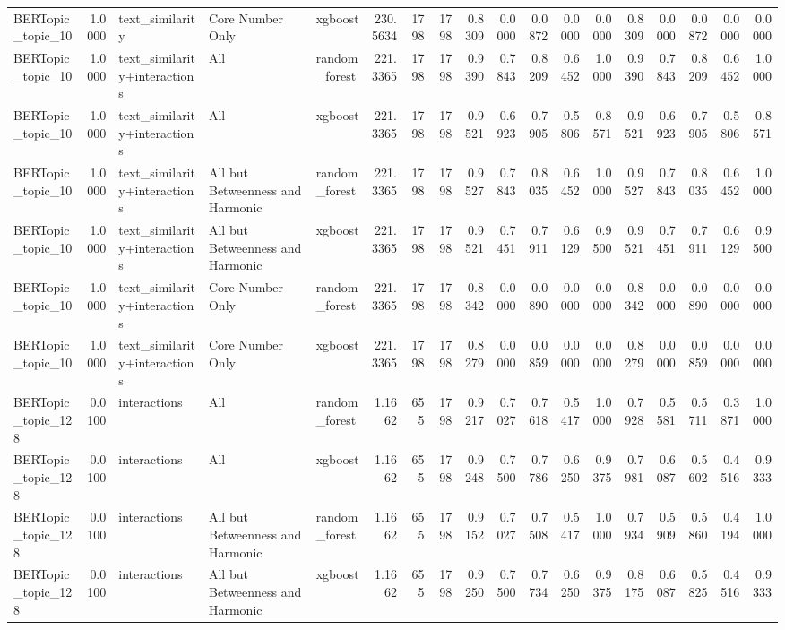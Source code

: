 \begin{tabular}{lrlllrrrrrrrrrrrrr}
BERTopic_topic_10 & 1.0000 & text_similarity & Core Number Only & xgboost & 230.5634 & 1798 & 1798 & 0.8309 & 0.0000 & 0.0872 & 0.0000 & 0.0000 & 0.8309 & 0.0000 & 0.0872 & 0.0000 & 0.0000 \\
BERTopic_topic_10 & 1.0000 & text_similarity+interactions & All & random_forest & 221.3365 & 1798 & 1798 & 0.9390 & 0.7843 & 0.8209 & 0.6452 & 1.0000 & 0.9390 & 0.7843 & 0.8209 & 0.6452 & 1.0000 \\
BERTopic_topic_10 & 1.0000 & text_similarity+interactions & All & xgboost & 221.3365 & 1798 & 1798 & 0.9521 & 0.6923 & 0.7905 & 0.5806 & 0.8571 & 0.9521 & 0.6923 & 0.7905 & 0.5806 & 0.8571 \\
BERTopic_topic_10 & 1.0000 & text_similarity+interactions & All but Betweenness and Harmonic & random_forest & 221.3365 & 1798 & 1798 & 0.9527 & 0.7843 & 0.8035 & 0.6452 & 1.0000 & 0.9527 & 0.7843 & 0.8035 & 0.6452 & 1.0000 \\
BERTopic_topic_10 & 1.0000 & text_similarity+interactions & All but Betweenness and Harmonic & xgboost & 221.3365 & 1798 & 1798 & 0.9521 & 0.7451 & 0.7911 & 0.6129 & 0.9500 & 0.9521 & 0.7451 & 0.7911 & 0.6129 & 0.9500 \\
BERTopic_topic_10 & 1.0000 & text_similarity+interactions & Core Number Only & random_forest & 221.3365 & 1798 & 1798 & 0.8342 & 0.0000 & 0.0890 & 0.0000 & 0.0000 & 0.8342 & 0.0000 & 0.0890 & 0.0000 & 0.0000 \\
BERTopic_topic_10 & 1.0000 & text_similarity+interactions & Core Number Only & xgboost & 221.3365 & 1798 & 1798 & 0.8279 & 0.0000 & 0.0859 & 0.0000 & 0.0000 & 0.8279 & 0.0000 & 0.0859 & 0.0000 & 0.0000 \\
BERTopic_topic_128 & 0.0100 & interactions & All & random_forest & 1.1662 & 655 & 1798 & 0.9217 & 0.7027 & 0.7618 & 0.5417 & 1.0000 & 0.7928 & 0.5581 & 0.5711 & 0.3871 & 1.0000 \\
BERTopic_topic_128 & 0.0100 & interactions & All & xgboost & 1.1662 & 655 & 1798 & 0.9248 & 0.7500 & 0.7786 & 0.6250 & 0.9375 & 0.7981 & 0.6087 & 0.5602 & 0.4516 & 0.9333 \\
BERTopic_topic_128 & 0.0100 & interactions & All but Betweenness and Harmonic & random_forest & 1.1662 & 655 & 1798 & 0.9152 & 0.7027 & 0.7508 & 0.5417 & 1.0000 & 0.7934 & 0.5909 & 0.5860 & 0.4194 & 1.0000 \\
BERTopic_topic_128 & 0.0100 & interactions & All but Betweenness and Harmonic & xgboost & 1.1662 & 655 & 1798 & 0.9250 & 0.7500 & 0.7734 & 0.6250 & 0.9375 & 0.8175 & 0.6087 & 0.5825 & 0.4516 & 0.9333 \\

\end{tabular}
